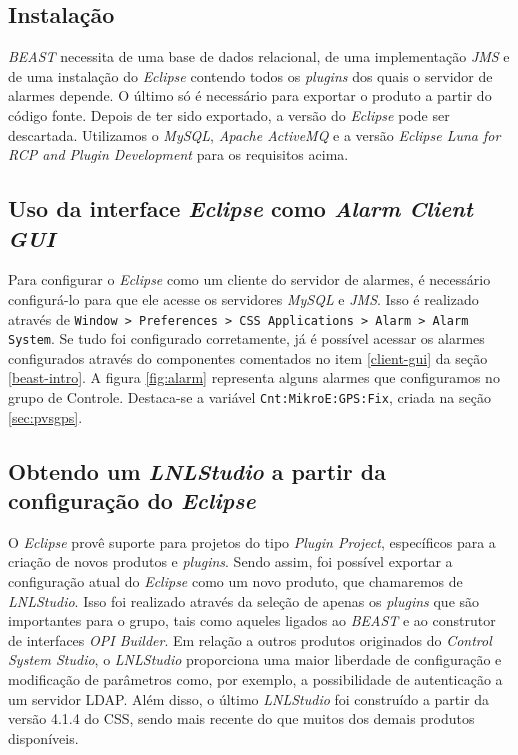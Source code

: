 \subsection{Instalação}

\textit{BEAST} necessita de uma base de dados relacional, de uma implementação
\textit{JMS} e de uma instalação do \textit{Eclipse} contendo todos os
\textit{plugins} dos quais o servidor de alarmes depende. O último só é
necessário para exportar o produto a partir do código fonte. Depois
de ter sido exportado, a versão do \textit{Eclipse} pode ser
descartada. Utilizamos o \textit{MySQL}, \textit{Apache
ActiveMQ} e a versão \textit{Eclipse Luna for RCP and Plugin Development} para
os requisitos acima.


\subsection{Uso da interface \textit{Eclipse} como \textit{Alarm Client GUI}}

Para configurar o \textit{Eclipse} como um cliente do servidor de alarmes, é
necessário configurá-lo para que ele acesse os servidores \textit{MySQL} e
\textit{JMS}. Isso é realizado através de \texttt{Window > Preferences > CSS
Applications > Alarm > Alarm System}. Se tudo foi configurado corretamente, já é
possível acessar os alarmes configurados através do componentes comentados no
item \ref{client-gui} da seção \ref{beast-intro}. A figura \ref{fig:alarm}
representa alguns alarmes que configuramos no grupo de Controle. Destaca-se a
variável \texttt{Cnt:MikroE:GPS:Fix}, criada na seção \ref{sec:pvsgps}.

\subsection {Obtendo um \textit{LNLStudio} a partir da configuração do
\textit{Eclipse}}

O \textit{Eclipse} provê suporte para projetos do tipo
\textit{Plugin Project}, específicos para a criação de novos produtos e
\textit{plugins}. Sendo assim, foi possível exportar a configuração atual do
\textit{Eclipse} como um novo produto, que chamaremos de \textit{LNLStudio}.
Isso foi realizado através da seleção de apenas os \textit{plugins} que são
importantes para o grupo, tais como aqueles ligados ao \textit{BEAST} e ao
construtor de interfaces \textit{OPI Builder}.  Em relação a outros produtos
originados do \textit{Control System Studio}, o \textit{LNLStudio} proporciona
uma maior liberdade de configuração e modificação de parâmetros como, por
exemplo, a possibilidade de autenticação a um servidor LDAP. Além disso, o
último \textit{LNLStudio} foi construído a partir da versão 4.1.4 do CSS, sendo
mais recente do que muitos dos demais produtos disponíveis.

 
